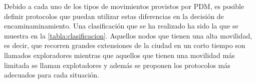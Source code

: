 

Debido a cada uno de los tipos de movimientos provistos por PDM, es posible
definir protocolos que puedan utilizar estas diferencias en la decisión de
encaminaminamiento. Una clasificación que se ha realizado ha sido la que se
muestra en la \ref{tabla:clasificacion}. Aquellos nodos que tienen una alta
movilidad, es decir, que recorren grandes extensiones de la ciudad en un corto
tiempo son llamados exploradores mientras que aquellos que tienen una movilidad
más limitada se llaman explotadores y además se proponen
\cite{paper_evaluacion_nosotros} los protocolos más adecuados para cada
situación.


